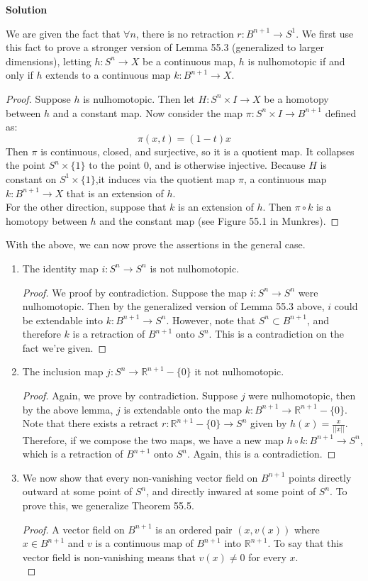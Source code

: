 \documentclass[12pt]{article}
\newcounter{AnswerCounter}
\newcounter{SubAnswerCounter}
\newenvironment{answer}[0]{
  \setcounter{SubAnswerCounter}{1}
  \bigskip
  \textbf{Solution \arabic{AnswerCounter}}
  \\
  \begin{small}
}{
  \end{small}
  \stepcounter{AnswerCounter}
}
\begin{document}
\begin{answer}[Page 353, \#4]
We are given the fact that $\forall n$, there is no retraction $r : B^{n+1} \to S^1$. We first use this fact to prove a stronger version of Lemma 55.3 (generalized to larger dimensions), letting $h: S^n \to X$ be a continuous map, $h$ is nulhomotopic if and only if $h$ extends to a continuous map $k: B^{n+1} \to X$.
\begin{proof}
Suppose $h$ is nulhomotopic. Then let $H: S^{n} \times I \to X$ be a homotopy between $h$ and a constant map. Now consider the map $\pi: S^n \times I \to B^{n+1}$ defined as:
$$
\pi(x,t) = (1-t)x
$$
Then $\pi$ is continuous, closed, and surjective, so it is a quotient map. It collapses the point $S^n \times \{1\}$ to the point $0$, and is otherwise injective. Because $H$ is constant on $S^1 \times \{1\}$,it induces via the quotient map $\pi$, a continuous map $k: B^{n+1} \to X$ that is an extension of $h$. \\

For the other direction, suppose that $k$ is an extension of $h$. Then $\pi \circ k$ is a homotopy between $h$ and the constant map (see Figure 55.1 in Munkres).  
\end{proof}
With the above, we can now prove the assertions in the general case.
\begin{enumerate}
\item The identity map $i: S^n \to S^n$ is not nulhomotopic. 
\begin{proof}
We proof by contradiction. Suppose the map $i: S^n \to S^n$ were nulhomotopic. Then by the generalized version of Lemma 55.3 above, $i$ could be extendable into $k: B^{n+1} \to S^n$. However, note that $S^n \subset B^{n+1}$, and therefore $k$ is a retraction of $B^{n+1}$ onto $S^n$. This is a contradiction on the fact we're given.
\end{proof}
\item The inclusion map $j: S^n \to \mathbb{R}^{n+1} - \{0\}$ it not nulhomotopic. 
\begin{proof}
Again, we prove by contradiction. Suppose $j$ were nulhomotopic, then by the above lemma, $j$ is extendable onto the map $k: B^{n+1} \to \mathbb{R}^{n+1} - \{0\}$. Note that there exists a retract $r: \mathbb{R}^{n+1} - \{0\} \to S^n$ given by $h(x) = \frac{x}{||x||}$. Therefore, if we compose the two maps, we have a new map $h \circ k: B^{n+1} \to S^n$, which is a retraction of $B^{n+1}$ onto $S^n$. Again, this is a contradiction.  
\end{proof}
\item We now show that every non-vanishing vector field on $B^{n+1}$ points directly outward at some point of $S^n$, and directly inwared at some point of $S^n$. To prove this, we generalize Theorem 55.5.
\begin{proof}
A vector field on $B^{n+1}$ is an ordered pair $(x,v(x))$ where $x \in B^{n+1}$ and $v$ is a continuous map of $B^{n+1}$ into $\mathbb{R}^{n+1}$. To say that this vector field is non-vanishing means that $v(x) \neq 0$ for every $x$. \\


\end{proof}
\end{enumerate}
\end{answer}
\end{document}
